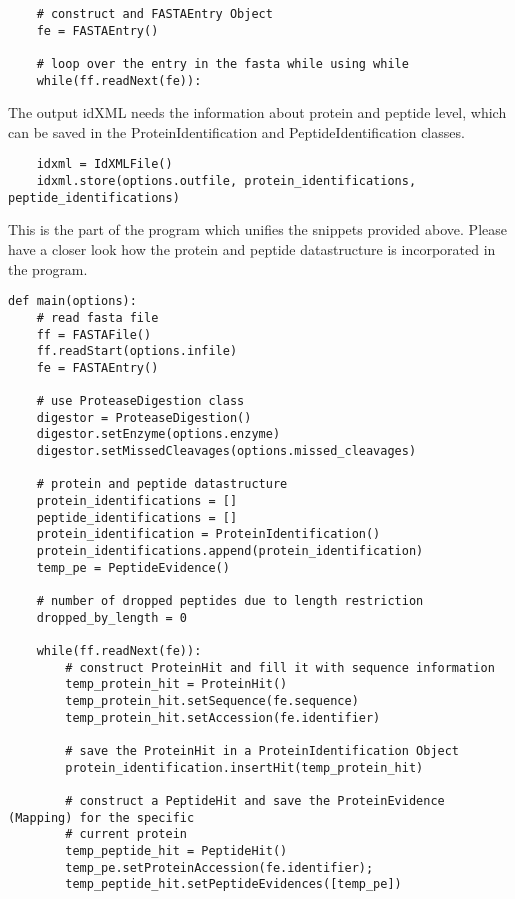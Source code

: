 {\begin{code}
\begin{verbatim}
    # construct and FASTAEntry Object 
    fe = FASTAEntry()
    
    # loop over the entry in the fasta while using while
    while(ff.readNext(fe)): 
\end{verbatim}
\end{code}

\noindent The output idXML needs the information about protein and peptide level, which can be saved in the ProteinIdentification and PeptideIdentification classes. 
\begin{code}
\begin{verbatim}
    idxml = IdXMLFile()
    idxml.store(options.outfile, protein_identifications, peptide_identifications)
\end{verbatim}
\end{code}

\noindent This is the part of the program which unifies the snippets provided above. Please have a closer look how the protein and peptide datastructure is incorporated in the program. 

\begin{code}
\begin{verbatim}
def main(options):
    # read fasta file  
    ff = FASTAFile()
    ff.readStart(options.infile)
    fe = FASTAEntry()

    # use ProteaseDigestion class 
    digestor = ProteaseDigestion()
    digestor.setEnzyme(options.enzyme)
    digestor.setMissedCleavages(options.missed_cleavages)

    # protein and peptide datastructure
    protein_identifications = []
    peptide_identifications = []
    protein_identification = ProteinIdentification()
    protein_identifications.append(protein_identification)
    temp_pe = PeptideEvidence()

    # number of dropped peptides due to length restriction
    dropped_by_length = 0

    while(ff.readNext(fe)):  
        # construct ProteinHit and fill it with sequence information
        temp_protein_hit = ProteinHit()
        temp_protein_hit.setSequence(fe.sequence)
        temp_protein_hit.setAccession(fe.identifier)

        # save the ProteinHit in a ProteinIdentification Object 
        protein_identification.insertHit(temp_protein_hit)
       
        # construct a PeptideHit and save the ProteinEvidence (Mapping) for the specific 
        # current protein
        temp_peptide_hit = PeptideHit()
        temp_pe.setProteinAccession(fe.identifier);
        temp_peptide_hit.setPeptideEvidences([temp_pe])


\end{verbatim}
\end{code}}
